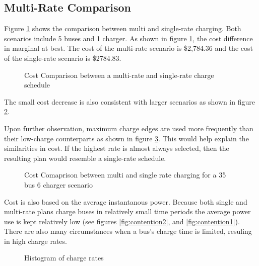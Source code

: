 \subsection{Multi-Rate Comparison}
Figure \ref{fig:multiRateCostComparison} shows the comparison between multi and single-rate charging. Both scenarios include 5 buses and 1 charger. As shown in figure \ref{fig:multiRateCostComparison}, the cost difference in marginal at best.  The cost of the multi-rate scenario is \$2,784.36 and the cost of the single-rate scenario is \$2784.83. 
\begin{figure}
	\centering
	\caption{Cost Comparison between a multi-rate and single-rate charge schedule}
	\label{fig:multiRateCostComparison}
\end{figure}
The small cost decrease is also consistent with larger scenarios as shown in figure \ref{fig:costComparisonMultiVsSingleLarge}. 
\par Upon further observation, maximum charge edges are used more frequently than their low-charge counterparts as shown in figure \ref{fig:chargeRateHistogram}. This would help explain the similarities in cost. If the highest rate is almost always selected, then the resulting plan would resemble a single-rate schedule.  
\begin{figure}
	\caption{Cost Comaprison between multi and single rate charging for a 35 bus 6 charger scenario}
	\label{fig:costComparisonMultiVsSingleLarge}
\end{figure}
\par Cost is also based on the average instantanous power. Because both single and multi-rate plans charge buses in relatively small time periods the average power use is kept relatively low (see figures \ref{fig:contention2}, and \ref{fig:contention1}). There are also many circumstances when a bus's charge time is limited, resuling in high charge rates.
\begin{figure}
	\caption{Histogram of charge rates}
	\label{fig:chargeRateHistogram}
\end{figure}













